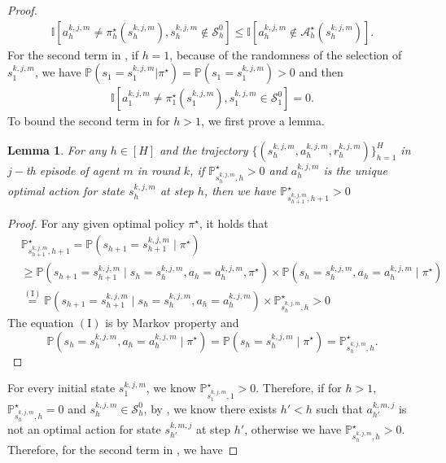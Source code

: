 \documentclass{article}
\newtheorem{lemma}{Lemma}[section]
\begin{document}
\begin{proof}
    \begin{align}
        \label{notequal1}
        \mathbb{I}\left[a_h^{k,j,m} \neq \pi_h^{\star}(s_h^{k,j,m}), s_h^{k,j,m} \notin \mathcal{S}_h^0 \right] \leq \mathbb{I}\left[a_h^{k,j,m} \notin \mathcal{A}_h^{\star}(s_h^{k,j,m})\right].
    \end{align}
    For the second term in , if $h = 1$, because of the randomness of the selection of $s_1^{k,j,m}$, we have $\mathbb{P}(s_1 = s_1^{k,j,m}|\pi^{\star})= \mathbb{P}(s_1 = s_1^{k,j,m}) > 0$ and then
    \begin{align}\label{1notequal2}
        \mathbb{I}\left[a_1^{k,j,m} \neq \pi_1^{\star}(s_1^{k,j,m}), s_1^{k,j,m} \in \mathcal{S}_1^0\right] = 0.
    \end{align}
    To bound the second term in  for $h > 1$, we first prove a lemma.
    \begin{lemma}
    \label{forwardpositive}
        For any $h \in [H]$ and the trajectory $\{(s_h^{k,j,m}, a_h^{k,j,m} ,r_h^{k,j,m})\}_{h=1}^H$ in $j-$th episode of agent $m$ in round $k$, if $\mathbb{P}_{s_{h}^{k,j,m},h}^{\star}>0$ and $a_{h}^{k,j,m}$ is the unique optimal action for state $s_{h}^{k,j,m}$ at step $h$, then we have $\mathbb{P}_{s_{h+1}^{k,j,m},h+1}^{\star}>0$
    \end{lemma}
    \begin{proof}
    For any given optimal policy $\pi^{\star}$, it holds that
    \begin{align*}
        &\mathbb{P}_{s_{h+1}^{k,j,m},h+1}^{\star} = \mathbb{P}\left(s_{h+1} = s_{h+1}^{k,j,m} \mid \pi^{\star}\right) \\
        &\geq \mathbb{P}\left(s_{h+1} = s_{h+1}^{k,j,m} \mid s_h = s_{h}^{k,j,m}, a_h = a_{h}^{k,j,m}, \pi^{\star}\right) \times \mathbb{P}\left(s_{h} = s_{h}^{k,j,m}, a_h = a_{h}^{k,j,m} \mid \pi^{\star}\right)\\
        & \overset{\mathrm{(I)}}{=} \mathbb{P}\left(s_{h+1} = s_{h+1}^{k,j,m} \mid s_h = s_{h}^{k,j,m}, a_h = a_{h}^{k,j,m}\right) \times \mathbb{P}_{s_{h}^{k,j,m},h}^{\star} >0
    \end{align*}
    The equation $\mathrm{(I)}$ is by Markov property and $$\mathbb{P}(s_{h} = s_{h}^{k,j,m}, a_h = a_{h}^{k,j,m} \mid \pi^{\star}) = \mathbb{P}(s_{h} = s_{h}^{k,j,m} \mid \pi^{\star}) = \mathbb{P}_{s_{h}^{k,j,m},h}^{\star}.$$
    \end{proof}
    For every initial state $s_1^{k,j,m}$, we know $\mathbb{P}_{s_{1}^{k,j,m},1}^{\star}>0$. Therefore, if for $h>1$, $\mathbb{P}_{s_{h}^{k,j,m},h}^{\star}= 0$ and $s_h^{k,j,m} \in \mathcal{S}_h^0 $, by , we know there exists $h' < h$ such that $a_{h'}^{k,m,j}$ is not an optimal action for state $s_{h'}^{k,m,j}$ at step $h'$, otherwise we have $\mathbb{P}_{s_{h}^{k,j,m},h}^{\star}> 0$. Therefore, for the second term in , we have

\end{proof}
\end{document}
